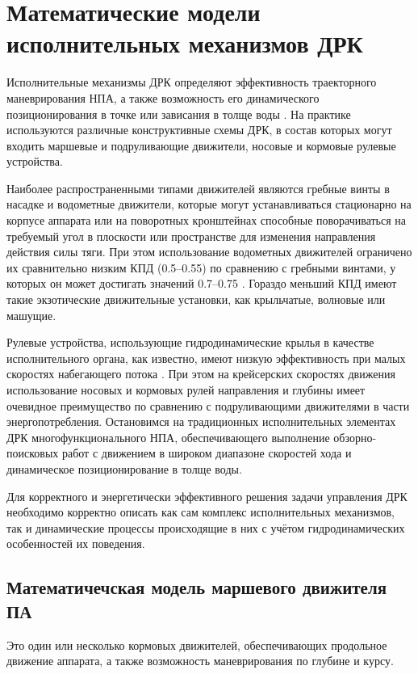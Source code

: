 \chapter{Математические модели исполнительных механизмов ДРК}\label{ch:Propulsion}

Исполнительные механизмы ДРК определяют эффективность траекторного маневрирования НПА, а также возможность его динамического позиционирования в точке или зависания в толще воды \cite{костенко2017оценка}.
На практике используются различные конструктивные схемы ДРК, в состав которых могут входить маршевые и подруливающие движители, носовые и кормовые рулевые устройства.

Наиболее распространенными типами движителей являются гребные винты в насадке и водометные движители, которые могут устанавливаться стационарно на корпусе аппарата или на поворотных кронштейнах способные поворачиваться на требуемый угол в плоскости или пространстве для изменения направления действия силы тяги.
При этом использование водометных движителей ограничено их сравнительно низким КПД (0.5–0.55) по сравнению с гребными винтами, у которых он может достигать значений 0.7–0.75 \cite{инзарцев2018подводные}. Гораздо меньший КПД имеют такие экзотические движительные установки, как крыльчатые, волновые или машущие. 

Рулевые устройства, использующие гидродинамические крылья в качестве исполнительного органа, как известно, имеют низкую эффективность при малых скоростях набегающего потока \cite{агеев2015авто}.
При этом на крейсерских скоростях движения использование носовых и кормовых рулей направления и глубины имеет очевидное преимущество по сравнению с подруливающими движителями в части энергопотребления.
Остановимся на традиционных исполнительных элементах ДРК многофункционального НПА, обеспечивающего выполнение обзорно-поисковых работ с движением в широком диапазоне скоростей хода и динамическое позиционирование в толще воды.

Для корректного и энергетически эффективного решения задачи управления ДРК необходимо корректно описать как сам комплекс исполнительных механизмов, так и динамические процессы происходящие в них с учётом гидродинамических особенностей их поведения.

\section{Математичечская модель маршевого движителя ПА}

Это один или несколько кормовых движителей, обеспечивающих продольное движение аппарата, а также возможность маневрирования по глубине и курсу.

